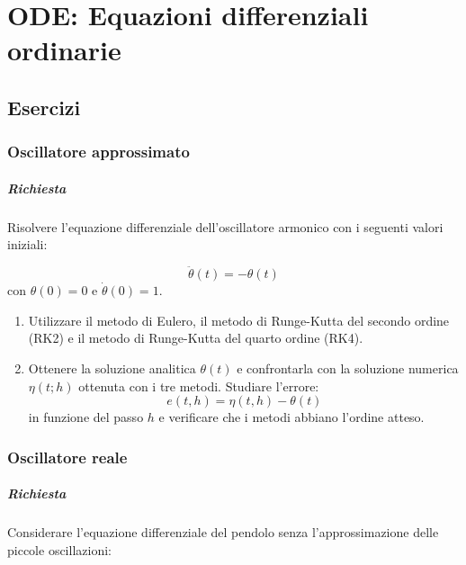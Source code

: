 \setchapterpreamble[u]{\margintoc}
\chapter{ODE: Equazioni differenziali ordinarie}

\section{Esercizi}

\subsection{Oscillatore approssimato}

\paragraph{Richiesta}

Risolvere l'equazione differenziale dell'oscillatore armonico con i seguenti valori iniziali:

\begin{equation}
\ddot{\theta}(t) = -\theta(t)
\end{equation}
con $\theta(0) = 0$ e $\dot{\theta}(0) = 1$.

\begin{enumerate}
    \item Utilizzare il metodo di Eulero, il metodo di Runge-Kutta del secondo ordine (RK2) e il metodo di Runge-Kutta del quarto ordine (RK4).

    \item Ottenere la soluzione analitica $\theta(t)$ e confrontarla con la soluzione numerica $\eta(t;h)$ ottenuta con i tre metodi. Studiare l'errore:
   \[
   e(t,h) = \eta(t,h) - \theta(t)
   \]
   in funzione del passo $h$ e verificare che i metodi abbiano l'ordine atteso.

\end{enumerate}

\subsection{Oscillatore reale}

\paragraph{Richiesta}

Considerare l'equazione differenziale del pendolo senza l'approssimazione delle piccole oscillazioni:

